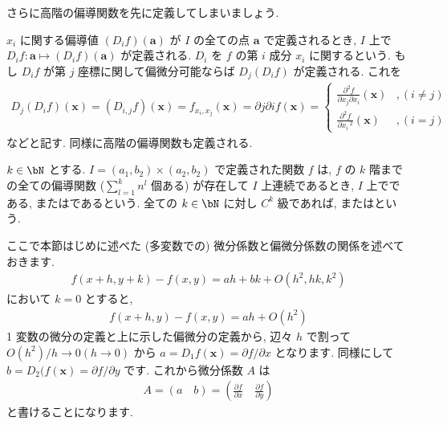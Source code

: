\documentclass[openany, a4paper, oneside]{jsbook}
\begin{document}
さらに高階の偏導関数を先に定義してしまいましょう.
\begin{defn}
 $x_i$ に関する偏導値 $(D_if) (\bm{a})$ が $I$ の全ての点 $\bm{a}$ で定義されるとき,
 $I$ 上で $D_if:\bm{a}\mapsto (D_if) (\bm{a})$ が定義される.
 $D_i$ を $f$ の第 $i$ 成分 $x_i$ に関するという.
もし $D_if$ が第 $j$ 座標に関して偏微分可能ならば $D_j (D_if)$ が定義される. これを
    \begin{align}
        D_j (D_if) (\bm{x})
        =
        (D_{i,j}f) (\bm{x})
        =
        f_{x_i,x_j}(\bm{x})
        =
        \partial j \partial i f (\bm{x})
        =
        \begin{cases}
            \frac{\partial ^2 f}{\partial x_j \partial x_i}(\bm{x})&,(i\not= j)\\
            \frac{\partial ^2 f} {\partial x_i\,^2}(\bm{x})&,(i=j)
        \end{cases}
    \end{align}
などと記す. 同様に高階の偏導関数も定義される.
\end{defn}
\begin{defn}
 $k\in\bN$ とする.  $I=(a_1,b_2)\times (a_2,b_2)$ で定義された関数 $f$ は,  $f$ の $k$ 階までの全ての偏導関数
($\sum_{l=1}^k n^l$ 個ある) が存在して $I$ 上連続であるとき,  $I$ 上でである,
またはであるという.
全ての $k\in\bN$ に対し $C^k$ 級であれば, またはという.
\end{defn}

ここで本節はじめに述べた (多変数での) 微分係数と偏微分係数の関係を述べておきます.
\begin{align}
    f (x+h,y+k)-f (x,y)
    =
    ah + bk + O (h^2,h k,k^2)
\end{align}
において $k=0$ とすると,
\begin{align}
    f (x+h,y)-f (x,y)
    =
    ah + O (h^2)
\end{align}
1 変数の微分の定義と上に示した偏微分の定義から, 辺々 $h$ で割って $O (h^2)/h\to0 (h\to0)$ から
$a=D_1f (\bm{x})=\partial f/\partial x$ となります.
同様にして $b=D_2 (f (\bm{x})=\partial f/\partial y$ です.
これから微分係数 $A$ は
\begin{align}
    A
    =
    (a \quad b)
    =
    \left ( \frac{\partial f} {\partial x} \quad \frac{\partial f} {\partial y} \right)
\end{align}
と書けることになります.
\end{document}
